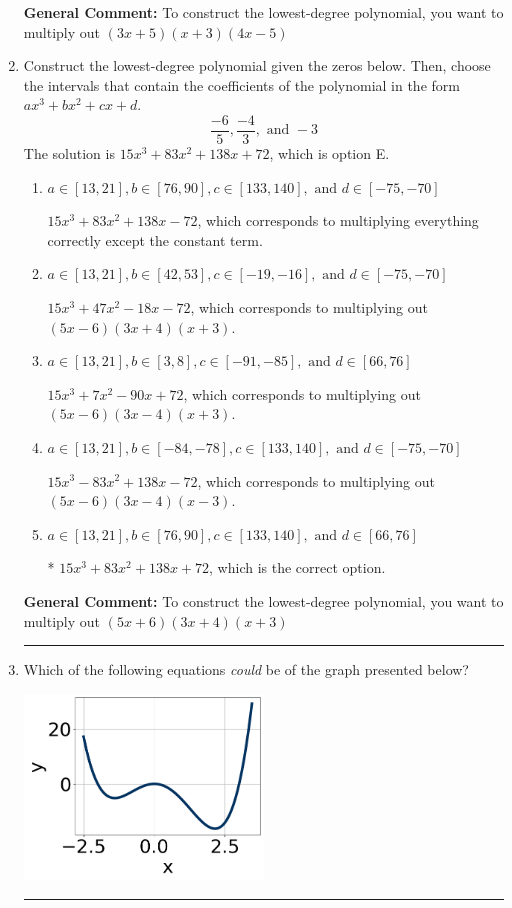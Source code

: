 \documentclass{extbook}[14pt]
\newcommand{\litem}[1]{\item #1

\rule{\textwidth}{0.4pt}}
\begin{document}
\begin{enumerate}
{\textbf{General Comment:} To construct the lowest-degree polynomial, you want to multiply out $(3x + 5)(x + 3)(4x -5)$
}
\litem{
Construct the lowest-degree polynomial given the zeros below. Then, choose the intervals that contain the coefficients of the polynomial in the form $ax^3+bx^2+cx+d$.
\[ \frac{-6}{5}, \frac{-4}{3}, \text{ and } -3 \]The solution is \( 15x^{3} +83 x^{2} +138 x + 72 \), which is option E.\begin{enumerate}[label=\Alph*.]
\item \( a \in [13, 21], b \in [76, 90], c \in [133, 140], \text{ and } d \in [-75, -70] \)

$15x^{3} +83 x^{2} +138 x -72$, which corresponds to multiplying everything correctly except the constant term.
\item \( a \in [13, 21], b \in [42, 53], c \in [-19, -16], \text{ and } d \in [-75, -70] \)

$15x^{3} +47 x^{2} -18 x -72$, which corresponds to multiplying out $(5x -6)(3x + 4)(x + 3)$.
\item \( a \in [13, 21], b \in [3, 8], c \in [-91, -85], \text{ and } d \in [66, 76] \)

$15x^{3} +7 x^{2} -90 x + 72$, which corresponds to multiplying out $(5x -6)(3x -4)(x + 3)$.
\item \( a \in [13, 21], b \in [-84, -78], c \in [133, 140], \text{ and } d \in [-75, -70] \)

$15x^{3} -83 x^{2} +138 x -72$, which corresponds to multiplying out $(5x -6)(3x -4)(x -3)$.
\item \( a \in [13, 21], b \in [76, 90], c \in [133, 140], \text{ and } d \in [66, 76] \)

* $15x^{3} +83 x^{2} +138 x + 72$, which is the correct option.
\end{enumerate}

\textbf{General Comment:} To construct the lowest-degree polynomial, you want to multiply out $(5x + 6)(3x + 4)(x + 3)$
}
\litem{
Which of the following equations \textit{could} be of the graph presented below?

\begin{center}
    \includegraphics[width=0.5\textwidth]{../Figures/polyGraphToFunctionCopyA.png}
\end{center}


}
\end{enumerate}
\end{document}
